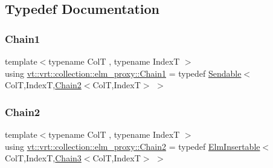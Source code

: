 \subsection{Typedef Documentation}
\mbox{\label{namespacevt_1_1vrt_1_1collection_1_1elm__proxy_af1c695e3f939aca249111179a57b24bf}} 
\subsubsection{\texorpdfstring{Chain1}{Chain1}}
{\footnotesize\ttfamily template$<$typename ColT , typename IndexT $>$ \\
using \hyperlink{namespacevt_1_1vrt_1_1collection_1_1elm__proxy_af1c695e3f939aca249111179a57b24bf}{vt\+::vrt\+::collection\+::elm\+\_\+proxy\+::\+Chain1} = typedef \hyperlink{structvt_1_1vrt_1_1collection_1_1_sendable}{Sendable}$<$ColT,IndexT,\hyperlink{namespacevt_1_1vrt_1_1collection_1_1elm__proxy_ad78450181b0704fe0969ae1d0f6cb4c7}{Chain2}$<$ColT,IndexT$>$ $>$}

\mbox{\label{namespacevt_1_1vrt_1_1collection_1_1elm__proxy_ad78450181b0704fe0969ae1d0f6cb4c7}} 
\subsubsection{\texorpdfstring{Chain2}{Chain2}}
{\footnotesize\ttfamily template$<$typename ColT , typename IndexT $>$ \\
using \hyperlink{namespacevt_1_1vrt_1_1collection_1_1elm__proxy_ad78450181b0704fe0969ae1d0f6cb4c7}{vt\+::vrt\+::collection\+::elm\+\_\+proxy\+::\+Chain2} = typedef \hyperlink{structvt_1_1vrt_1_1collection_1_1_elm_insertable}{Elm\+Insertable}$<$ColT,IndexT,\hyperlink{namespacevt_1_1vrt_1_1collection_1_1elm__proxy_a8db2caa0e0d4bb8dafc382c8953b2574}{Chain3}$<$ColT,IndexT$>$ $>$}

\mbox{\label{namespacevt_1_1vrt_1_1collection_1_1elm__proxy_a8db2caa0e0d4bb8dafc382c8953b2574}} 
